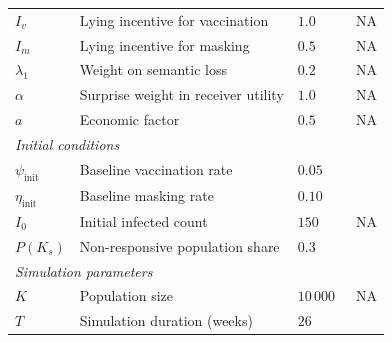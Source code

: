 \documentclass[sigconf,review]{acmart}
\begin{document}
\begin{table}[h]
\begin{minipage}{\textwidth}
\begin{tabular}{l|l|l|l}
\midrule
$I_v$         & Lying incentive for vaccination                       & $1.0$ & ~NA\\
$I_m$         & Lying incentive for masking                           & $0.5$ & ~NA\\
$\lambda_1$   & Weight on semantic loss                               & $0.2$ & ~NA\\
$\alpha$      & Surprise weight in receiver utility                   & $1.0$ & ~NA\\
$a$           & Economic factor                                       & $0.5$ & ~NA\\
\midrule
\multicolumn{4}{l}{\textit{Initial conditions}} \\
\midrule
$\psi_{\text{init}}$ & Baseline vaccination rate                      & $0.05$  & ~\cite{Oguz2019}\\
$\eta_{\text{init}}$ & Baseline masking rate                      & $0.10$ & ~\cite{pnas2021}\\
$I_0$                & Initial infected count                        & $150$  & ~NA\\
$P(K_s)$             & Non-responsive population share               & $0.3$ & ~\cite{sciadv.adj0266}\\
\midrule
\multicolumn{4}{l}{\textit{Simulation parameters}} \\ 
\midrule
$K$           & Population size                                       & $10\,000$ & ~NA \\
$T$           & Simulation duration (weeks)                           & $26$ & ~\cite{NEJMc}\\
\bottomrule
\end{tabular}
\end{minipage}
\end{table}
\end{document}
